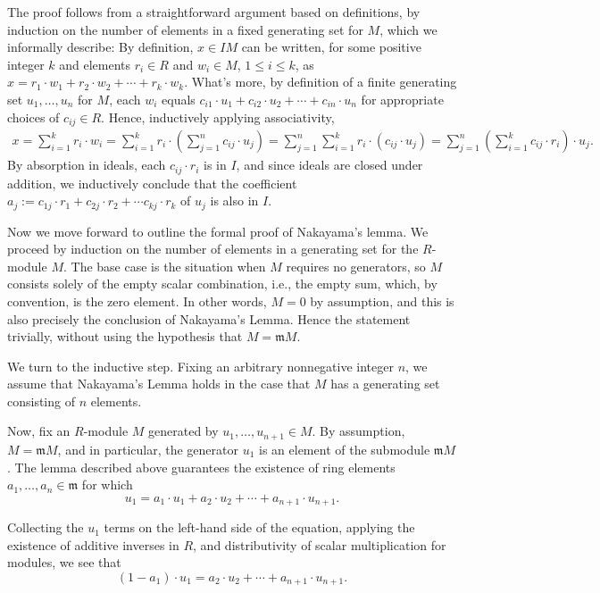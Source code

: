 \documentclass{article}
\begin{document}
The proof follows from a straightforward argument based on definitions, by induction on the number of elements in a fixed generating set for $M$, which we informally describe:  By definition, $x \in I M$ can  be written, for some positive integer $k$ and elements $r_i \in R$ and $w_i \in M$,  $1 \leq i \leq k$, as   $x = r_1 \cdot w_1 + r_2 \cdot w_2 + \cdots + r_k \cdot w_k$.
What's more, by definition of a finite generating set $u_{1},\dots, u_{n}$ for $M$,  each $w_i$ equals 
$c_{i1} \cdot u_1 + c_{i2} \cdot u_2 + \cdots + c_{in} \cdot u_n$ for appropriate choices of $c_{ij} \in R$. 
Hence, inductively applying associativity, 
\begin{align*}
  x = \sum_{i=1}^{k} r_i  \cdot  w_i  =  \sum_{i=1}^{k} r_i  \cdot  \left(  \sum_{j=1}^n c_{ij}  \cdot  u_j \right) 
  =   \sum_{j=1}^n  \sum_{i=1}^{k} r_i   \cdot  (c_{ij}  \cdot  u_j ) 
=  \sum_{j=1}^n \left( \sum_{i=1}^{k}  c_{ij}  \cdot   r_i \right)   \cdot  u_j.   
\end{align*}
By absorption in ideals, each  $c_{ij}  \cdot r_i$ is in $I$, and since ideals are closed under addition, we inductively conclude that 
the coefficient $a_j := c_{1j} \cdot  r_1 +  c_{2j} \cdot  r_2 +  \cdots c_{kj}\cdot r_k$ of $u_j$ is also in $I$. 

Now we move forward to outline the formal proof of Nakayama's lemma.
We proceed by induction on the number of elements in a generating set for the
$R$-module $M$. 
The base case is the situation when \(M\) requires no generators, so 
$M$ consists solely of the empty scalar combination, i.e., the empty sum, which, by convention, is the zero element.
In other words, $M = 0$ by assumption, and this is also precisely the 
conclusion of Nakayama's Lemma.  Hence the statement trivially, without using the hypothesis that $M = \mathfrak{m} M$.

We turn to the inductive step.  Fixing an arbitrary nonnegative integer $n$, 
we assume that Nakayama's Lemma holds in the case that $M$ has a generating set 
consisting of $n$ elements. 

Now, 
fix an $R$-module $M$ generated by $u_1, \ldots, u_{n+1} \in M$. 
By assumption, \(M = \mathfrak{m} M\), and in particular, 
the generator $u_1$ is an element of the submodule $\mathfrak{m}M$.
The lemma described above guarantees the existence of ring elements $a_1, \ldots, a_n \in \mathfrak{m}$
for which 
\[u_{1} = a_{1} \cdot u_{1} + a_2 \cdot u_2 + \cdots + a_{n+1} \cdot u_{n+1}. \]

Collecting the \(u_{1}\) terms
on the left-hand side of the equation, applying the existence of additive inverses in $R$, and
 distributivity of scalar multiplication for modules, we see that
\begin{equation} \label{equation1: e}
(1 - a_{1}) \cdot u_{1} = a_{2} \cdot u_{2} + \cdots + a_{n+1} \cdot u_{n+1}\text{.}
\end{equation}
\end{document}
